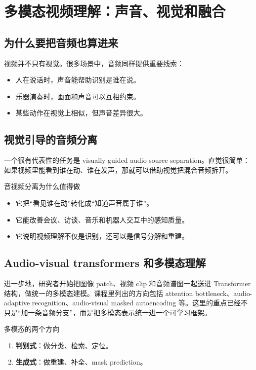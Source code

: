 \section{多模态视频理解：声音、视觉和融合}

\subsection{为什么要把音频也算进来}

视频并不只有视觉。很多场景中，音频同样提供重要线索：

\begin{itemize}
    \item 人在说话时，声音能帮助识别是谁在说。
    \item 乐器演奏时，画面和声音可以互相约束。
    \item 某些动作在视觉上相似，但声音差异很大。
\end{itemize}

\subsection{视觉引导的音频分离}

一个很有代表性的任务是 visually guided audio source separation。直觉很简单：如果视频里能看到谁在动、谁在发声，那就可以借助视觉把混合音频拆开。

\begin{knowledgebox}{音视频分离为什么值得做}
\begin{itemize}
    \item 它把“看见谁在动”转化成“知道声音属于谁”。
    \item 它能改善会议、访谈、音乐和机器人交互中的感知质量。
    \item 它说明视频理解不仅是识别，还可以是信号分解和重建。
\end{itemize}
\end{knowledgebox}

\subsection{Audio-visual transformers 和多模态理解}

进一步地，研究者开始把图像 patch、视频 clip 和音频谱图一起送进 Transformer 结构，做统一的多模态建模。课程里列出的方向包括 attention bottleneck、audio-adaptive recognition、audio-visual masked autoencoding 等。这里的重点已经不只是“加一条音频分支”，而是把多模态表示统一进一个可学习框架。

\begin{importantbox}{多模态的两个方向}
\begin{enumerate}
    \item \textbf{判别式}：做分类、检索、定位。
    \item \textbf{生成式}：做重建、补全、mask prediction。
\end{enumerate}
\end{importantbox}


